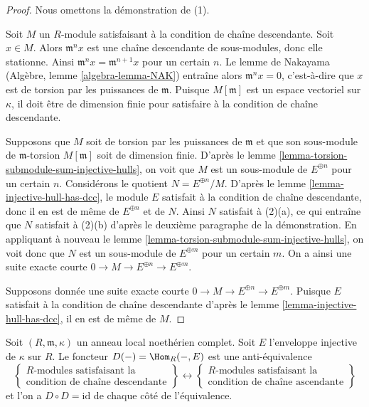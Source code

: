 \begin{proof}
Nous omettons la démonstration de (1).

\medskip\noindent
Soit $M$ un $R$-module satisfaisant à la condition de chaîne descendante.
Soit $x \in M$. Alors $\mathfrak m^n x$ est une chaîne descendante de sous-modules,
donc elle stationne. Ainsi $\mathfrak m^nx = \mathfrak m^{n + 1}x$ pour un certain $n$.
Le lemme de Nakayama (Algèbre, lemme \ref{algebra-lemma-NAK}) entraîne alors $\mathfrak m^n x = 0$,
c'est-à-dire que $x$ est de torsion par les puissances de $\mathfrak m$.
Puisque $M[\mathfrak m]$ est un espace vectoriel sur $\kappa$, il doit être de dimension
finie pour satisfaire à la condition de chaîne descendante.

\medskip\noindent
Supposons que $M$ soit de torsion par les puissances de $\mathfrak m$
et que son sous-module de $\mathfrak m$-torsion $M[\mathfrak m]$ soit de dimension finie.
D'après le lemme \ref{lemma-torsion-submodule-sum-injective-hulls}, on voit que $M$ est un sous-module
de $E^{\oplus n}$ pour un certain $n$.
Considérons le quotient $N = E^{\oplus n}/M$. D'après le lemme \ref{lemma-injective-hull-has-dcc},
le module $E$ satisfait à la condition de chaîne descendante,
donc il en est de même de $E^{\oplus n}$ et de $N$.
Ainsi $N$ satisfait à (2)(a), ce qui entraîne que $N$ satisfait
à (2)(b) d'après le deuxième paragraphe de la démonstration.
En appliquant à nouveau le lemme \ref{lemma-torsion-submodule-sum-injective-hulls}, on voit donc que $N$
est un sous-module de $E^{\oplus m}$ pour un certain $m$.
On a ainsi une suite exacte courte
$0 \to M \to E^{\oplus n} \to E^{\oplus m}$.

\medskip\noindent
Supposons donnée une suite exacte courte
$0 \to M \to E^{\oplus n} \to E^{\oplus m}$.
Puisque $E$ satisfait à la condition de chaîne descendante
d'après le lemme \ref{lemma-injective-hull-has-dcc}, il en est de même de $M$.
\end{proof}

\begin{proposition}
\label{proposition-matlis}
Soit $(R, \mathfrak m, \kappa)$ un anneau local noethérien complet.
Soit $E$ l'enveloppe injective de $\kappa$ sur $R$.
Le foncteur $D(-) = \Hom_R(-, E)$ est une anti-équivalence
$$
\left\{
\begin{matrix}
R\text{-modules satisfaisant la} \\
\text{condition de chaîne descendante}
\end{matrix}
\right\}
\longleftrightarrow
\left\{
\begin{matrix}
R\text{-modules satisfaisant la} \\
\text{condition de chaîne ascendante}
\end{matrix}
\right\}
$$
et l'on a $D \circ D = \text{id}$ de chaque côté de l'équivalence.
\end{proposition}

